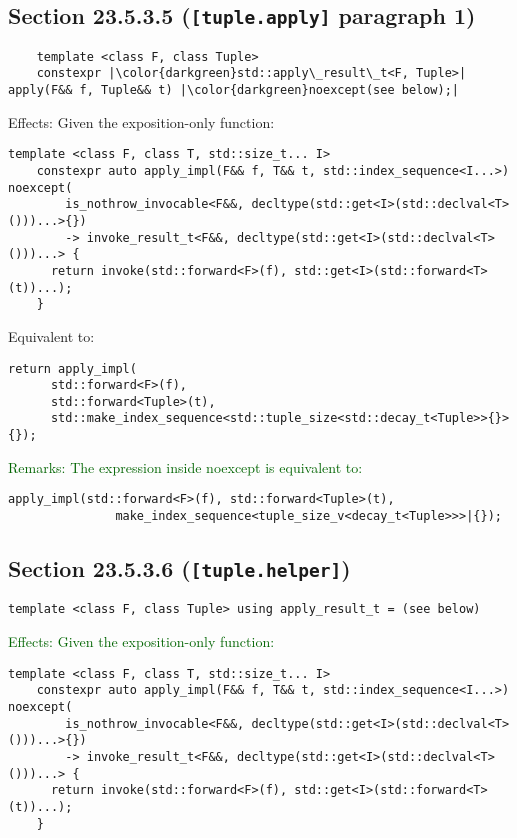 \documentclass{article}
\begin{document}
\subsection{Section 23.5.3.5 (\texttt{[tuple.apply]} paragraph 1)}
\begin{lstlisting}
    template <class F, class Tuple>
    constexpr |\color{darkgreen}std::apply\_result\_t<F, Tuple>| apply(F&& f, Tuple&& t) |\color{darkgreen}noexcept(see below);|
\end{lstlisting}

Effects: Given the exposition-only function:

\begin{lstlisting}[style=base]
    template <class F, class T, std::size_t... I>
    constexpr auto apply_impl(F&& f, T&& t, std::index_sequence<I...>) noexcept(
        is_nothrow_invocable<F&&, decltype(std::get<I>(std::declval<T>()))...>{})
        -> invoke_result_t<F&&, decltype(std::get<I>(std::declval<T>()))...> {
      return invoke(std::forward<F>(f), std::get<I>(std::forward<T>(t))...);
    }
\end{lstlisting}

Equivalent to:

\begin{lstlisting}[style=base]
  return apply_impl(
      std::forward<F>(f),
      std::forward<Tuple>(t),
      std::make_index_sequence<std::tuple_size<std::decay_t<Tuple>>{}>{});
\end{lstlisting}

\textcolor{darkgreen}{Remarks: The expression inside noexcept is equivalent to:}

\begin{lstlisting}[style=base]
    apply_impl(std::forward<F>(f), std::forward<Tuple>(t),
               make_index_sequence<tuple_size_v<decay_t<Tuple>>>|{});
\end{lstlisting}

\subsection{Section 23.5.3.6 (\texttt{[tuple.helper]})}

\begin{lstlisting}[style=base]
    template <class F, class Tuple> using apply_result_t = (see below)
\end{lstlisting}

\textcolor{darkgreen}{Effects: Given the exposition-only function:}

\begin{lstlisting}[style=base]
    template <class F, class T, std::size_t... I>
    constexpr auto apply_impl(F&& f, T&& t, std::index_sequence<I...>) noexcept(
        is_nothrow_invocable<F&&, decltype(std::get<I>(std::declval<T>()))...>{})
        -> invoke_result_t<F&&, decltype(std::get<I>(std::declval<T>()))...> {
      return invoke(std::forward<F>(f), std::get<I>(std::forward<T>(t))...);
    }
\end{lstlisting}
\end{document}
